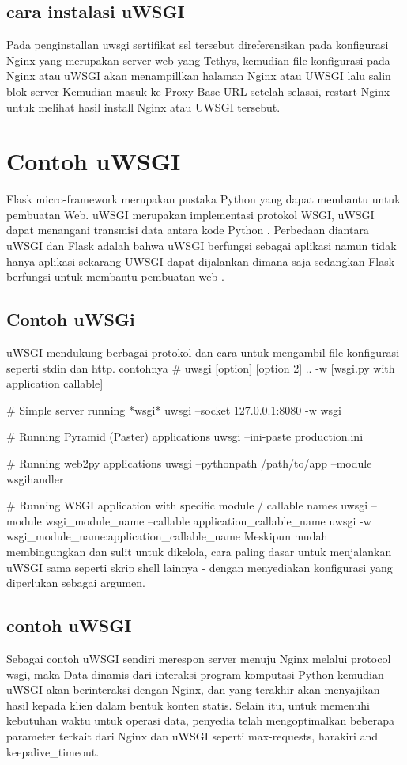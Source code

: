 \subsection {cara instalasi uWSGI}
Pada penginstallan uwsgi sertifikat ssl tersebut direferensikan pada konfigurasi Nginx yang merupakan server web yang Tethys, kemudian file konfigurasi pada Nginx atau uWSGI akan menampillkan halaman Nginx atau UWSGI lalu salin blok server Kemudian masuk ke Proxy Base URL setelah selasai, restart Nginx untuk melihat hasil install Nginx atau UWSGI tersebut\cite{pellicer2016desarrollo}.

\section{Contoh uWSGI}
Flask micro-framework merupakan pustaka Python yang dapat membantu untuk pembuatan Web. uWSGI merupakan implementasi protokol WSGI, uWSGI dapat menangani transmisi data
antara kode Python . Perbedaan diantara uWSGI dan Flask adalah bahwa uWSGI berfungsi sebagai aplikasi namun tidak hanya aplikasi sekarang UWSGI dapat dijalankan dimana saja sedangkan Flask berfungsi untuk membantu pembuatan web \cite{mulerolinked}.

\subsection{Contoh uWSGi}
uWSGI mendukung berbagai protokol dan cara untuk mengambil file  konfigurasi seperti stdin dan http. contohnya
# uwsgi [option] [option 2] .. -w [wsgi.py with application callable]

# Simple server running *wsgi*
uwsgi --socket 127.0.0.1:8080 -w wsgi

# Running Pyramid (Paster) applications
uwsgi --ini-paste production.ini

# Running web2py applications
uwsgi --pythonpath /path/to/app --module wsgihandler

# Running WSGI application with specific module / callable names
uwsgi --module wsgi_module_name --callable application_callable_name
uwsgi -w wsgi_module_name:application_callable_name
Meskipun mudah membingungkan dan sulit untuk dikelola, cara paling dasar untuk menjalankan uWSGI sama seperti skrip shell lainnya - dengan menyediakan konfigurasi yang diperlukan sebagai argumen\cite{cencini2017data}.

\subsection{contoh uWSGI}
Sebagai contoh uWSGI sendiri merespon server 	menuju Nginx melalui protocol wsgi, maka Data dinamis dari interaksi program komputasi Python kemudian uWSGI akan berinteraksi dengan Nginx, dan yang terakhir akan menyajikan hasil kepada klien dalam bentuk konten statis. Selain itu, untuk memenuhi kebutuhan waktu untuk operasi data, penyedia  telah mengoptimalkan beberapa parameter terkait dari Nginx dan uWSGI seperti max-requests, harakiri and keepalive_timeout\cite{dong2015chemdes}.

